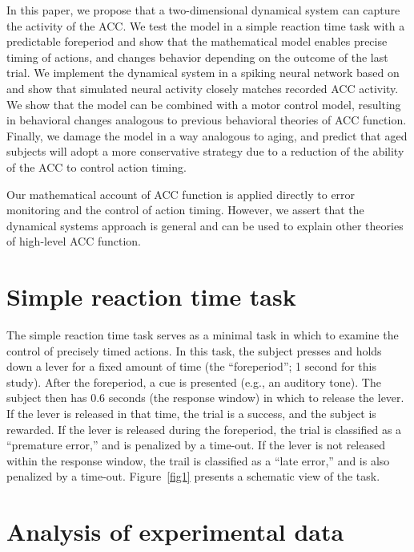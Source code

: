 \documentclass[11pt]{article}
\begin{document}
In this paper, we propose that a
two-dimensional dynamical system
can capture the activity of the ACC.
We test the model in a simple reaction time task
with a predictable foreperiod and
show that the mathematical model
enables precise timing of actions,
and changes behavior depending
on the outcome of the last trial.
We implement the dynamical system
in a spiking neural network
based on \citet{Singh2006}
and show that simulated neural activity
closely matches recorded ACC activity.
We show that the model
can be combined with
a motor control model,
resulting in behavioral changes
analogous to previous behavioral theories
of ACC function.
Finally, we damage the model in a way analogous
to aging, and predict that
aged subjects will adopt a more conservative
strategy due to a reduction of the
ability of the ACC to control action timing.

Our mathematical account of ACC function
is applied directly to
error monitoring and
the control of action timing.
However, we assert that the dynamical systems
approach is general and can be used
to explain other theories
of high-level ACC function.

\section{Simple reaction time task} \label{sec:simple-rt}

The simple reaction time task
serves as a minimal task in which
to examine the control of precisely timed actions.
In this task, the subject presses and holds down a lever
for a fixed amount of time (the ``foreperiod'';
1 second for this study).
After the foreperiod, a cue is presented
(e.g., an auditory tone).
The subject then has 0.6 seconds (the response window)
in which to release the lever.
If the lever is released in that time,
the trial is a success, and the subject is rewarded.
If the lever is released during the foreperiod,
the trial is classified as a ``premature error,''
and is penalized by a time-out.
If the lever is not released within the response window,
the trail is classified as a ``late error,''
and is also penalized by a time-out.
Figure~\ref{fig1} presents a schematic view of the task.

\section{Analysis of experimental data}
\end{document}
